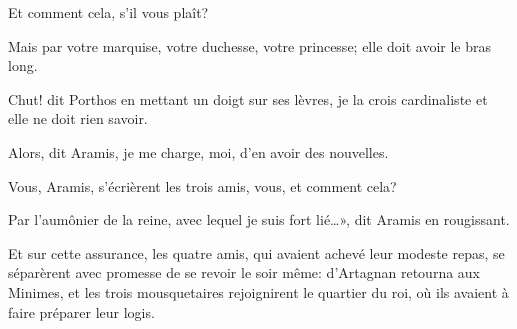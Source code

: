 \speak  Et comment cela, s'il vous plaît? 

\speak  Mais par votre marquise, votre duchesse, votre princesse; elle doit avoir le bras long. 

\speak  Chut! dit Porthos en mettant un doigt sur ses lèvres, je la crois cardinaliste et elle ne doit rien savoir. 

\speak  Alors, dit Aramis, je me charge, moi, d'en avoir des nouvelles. 

\speak  Vous, Aramis, s'écrièrent les trois amis, vous, et comment cela? 

\speak  Par l'aumônier de la reine, avec lequel je suis fort lié\dots», dit Aramis en rougissant. 

Et sur cette assurance, les quatre amis, qui avaient achevé leur modeste repas, se séparèrent avec promesse de se revoir le soir même: d'Artagnan retourna aux Minimes, et les trois mousquetaires rejoignirent le quartier du roi, où ils avaient à faire préparer leur logis. 